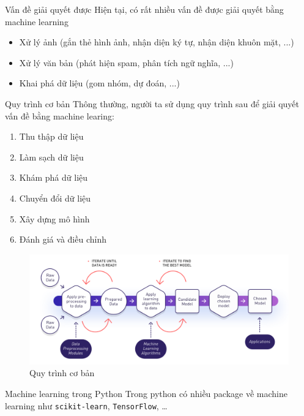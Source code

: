 \documentclass[11pt]{beamer}
\begin{document}
	\begin{frame}{Vấn đề giải quyết được}
		Hiện tại, có rất nhiều vấn đề được giải quyết bằng machine learning
		\begin{itemize}
			\item Xử lý ảnh (gắn thẻ hình ảnh, nhận diện ký tự, nhận diện khuôn mặt, ...)
			\item Xử lý văn bản (phát hiện spam, phân tích ngữ nghĩa, ...)
			\item Khai phá dữ liệu (gom nhóm, dự đoán, ...)
		\end{itemize}
	\end{frame}

	\begin{frame}{Quy trình cơ bản}
		Thông thường, người ta sử dụng quy trình sau để giải quyết vấn đề bằng machine learing:
		\begin{enumerate}
			\item Thu thập dữ liệu
			\item Làm sạch dữ liệu
			\item Khám phá dữ liệu
			\item Chuyển đổi dữ liệu
			\item Xây dựng mô hình
			\item Đánh giá và điều chỉnh
		\end{enumerate}
	\end{frame}

	\begin{frame}
		\begin{figure}
			\includegraphics[width=\textwidth]{ml.png}
			\caption{Quy trình cơ bản}
		\end{figure}
	\end{frame}

	\begin{frame}{Machine learning trong Python}
		Trong python có nhiều package về machine learning như \texttt{scikit-learn}, \texttt{TensorFlow}, \dots
	\end{frame}
\end{document}
